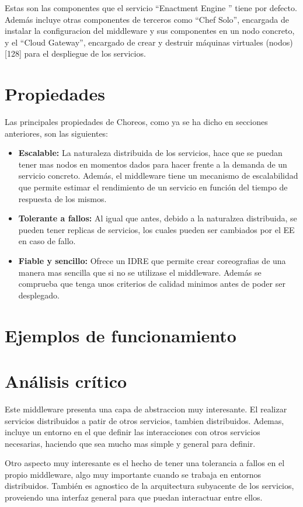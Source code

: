 \documentclass[runningheads]{llncs}
\begin{document}
Estas son las componentes que el servicio ``Enactment Engine '' tiene por defecto. Además incluye otras componentes de terceros como ``Chef Solo'', encargada de instalar la configuracion del middleware y sus componentes en un nodo concreto, y el ``Cloud Gateway'', encargado de crear y destruir máquinas virtuales (nodos)[128] para el despliegue de los servicios.

\section{Propiedades}
Las principales propiedades de Choreos, como ya se ha dicho en secciones anteriores, son las siguientes:

\begin{itemize}
    \item \textbf{Escalable: }La naturaleza distribuida de los servicios, hace que se puedan tener mas nodos en momentos dados para hacer frente a la demanda de un servicio concreto. Además, el middleware tiene un mecanismo de escalabilidad que permite estimar el rendimiento de un servicio en función del tiempo de respuesta de los mismos.
    \item \textbf{Tolerante a fallos: }Al igual que antes, debido a la naturalzea distribuida, se pueden tener replicas de servicios, los cuales pueden ser cambiados por el EE en caso de fallo.
    \item \textbf{Fiable y sencillo: }Ofrece un IDRE que permite crear coreografias de una manera mas sencilla que si no se utilizase el middleware. Además se comprueba que tenga unos criterios de calidad minimos antes de poder ser desplegado.
\end{itemize}
\section{Ejemplos de funcionamiento}
\section{Análisis crítico}
Este middleware presenta una capa de abstraccion muy interesante. El realizar servicios distribuidos a patir de otros servicios, tambien distribuidos. Ademas, incluye un entorno en el que definir las interacciones con otros servicios necesarias, haciendo que sea mucho mas simple y general para definir.

Otro aspecto muy interesante es el hecho de tener una tolerancia a fallos en el propio middleware, algo muy importante cuando se trabaja en entornos distribuidos. También es agnostico de la arquitectura subyacente de los servicios, proveiendo una interfaz general para que puedan interactuar entre ellos.
\end{document}
